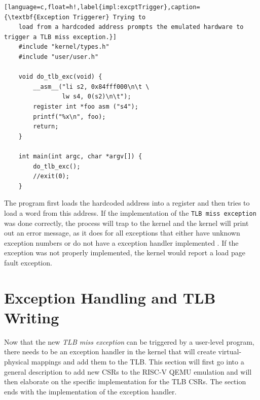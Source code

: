 \begin{lstlisting}[language=c,float=h!,label{impl:excptTrigger},caption={\textbf{Exception Triggerer} Trying to
    load from a hardcoded address prompts the emulated hardware to trigger a TLB miss exception.}]
    #include "kernel/types.h"
    #include "user/user.h"

    void do_tlb_exc(void) {
        __asm__("li s2, 0x84fff000\n\t \
                lw s4, 0(s2)\n\t");
        register int *foo asm ("s4");
        printf("%x\n", foo);
        return;
    }

    int main(int argc, char *argv[]) {
        do_tlb_exc();
        //exit(0);
    }
\end{lstlisting}



The program first loads the hardcoded address into a register and then tries to load a word from this address.
If the implementation of the \texttt{TLB miss exception} was done correctly, the process will trap to the kernel
and the kernel will print out an error message, as it does for all exceptions that either have unknown exception
numbers or do not have a exception handler implemented \cite{cox2011xv6}.
If the exception was not properly implemented, the kernel would report a load page fault exception.




\section{Exception Handling and TLB Writing}
\label{sect:tlbwrite}

Now that the new \textit{TLB miss exception} can be triggered by a user-level program, there needs
to be an exception handler in the kernel that will create virtual-physical mappings and add them to the
TLB.
This section will first go into a general description to add new CSRs to the RISC-V QEMU emulation and
will then elaborate on the specific implementation for the TLB CSRs.
The section ends with the implementation of the exception handler.

